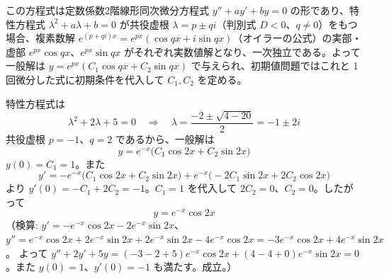
この方程式は定数係数2階線形同次微分方程式 $y'' + ay' + by = 0$ の形であり、特性方程式 $\lambda^{2} + a\lambda + b = 0$ が共役虚根 $\lambda = p \pm qi$（判別式 $D<0$、$q \neq 0$）をもつ場合、複素数解 $e^{(p+qi)x} = e^{px}(\cos qx + i\sin qx)$（オイラーの公式）の実部・虚部 $e^{px}\cos qx$、$e^{px}\sin qx$ がそれぞれ実数値解となり、一次独立である。よって一般解は $y = e^{px}(C_{1}\cos qx + C_{2}\sin qx)$ で与えられ、初期値問題ではこれと 1 回微分した式に初期条件を代入して $C_{1}, C_{2}$ を定める。

特性方程式は
\[
\lambda^{2} + 2\lambda + 5 = 0 \quad\Longrightarrow\quad \lambda = \frac{-2 \pm \sqrt{4-20}}{2} = -1 \pm 2i
\]
共役虚根 $p = -1$、$q = 2$ であるから、一般解は
\[
y = e^{-x}\bigl(C_{1}\cos 2x + C_{2}\sin 2x\bigr)
\]
$y(0) = C_{1} = 1$。また
\[
y' = -e^{-x}\bigl(C_{1}\cos 2x + C_{2}\sin 2x\bigr) + e^{-x}\bigl(-2C_{1}\sin 2x + 2C_{2}\cos 2x\bigr)
\]
より $y'(0) = -C_{1} + 2C_{2} = -1$。$C_{1}=1$ を代入して $2C_{2} = 0$、$C_{2} = 0$。したがって
\[
\boxed{\; y = e^{-x}\cos 2x \;}
\]
（検算: $y' = -e^{-x}\cos 2x - 2e^{-x}\sin 2x$、
$y'' = e^{-x}\cos 2x + 2e^{-x}\sin 2x + 2e^{-x}\sin 2x - 4e^{-x}\cos 2x = -3e^{-x}\cos 2x + 4e^{-x}\sin 2x$。
よって $y''+2y'+5y = (-3-2+5)e^{-x}\cos 2x + (4-4+0)e^{-x}\sin 2x = 0$。また $y(0)=1$、$y'(0)=-1$ も満たす。成立。）
